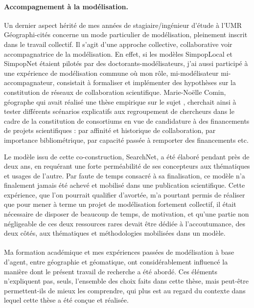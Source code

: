 \paragraph{Accompagnement à la modélisation.}
Un dernier aspect hérité de mes années de stagiaire/ingénieur d'étude à l'UMR Géographi-cités concerne un mode particulier de modélisation, pleinement inscrit dans le travail collectif.
Il s'agit d'une approche collective, collaborative voir accompagnatrice de la modélisation.
En effet, si les modèles SimpopLocal et SimpopNet étaient pilotés par des doctorants-modélisateurs, j'ai aussi participé à une expérience de modélisation commune où mon rôle, mi-modélisateur mi-accompagnateur, consistait à formaliser et implémenter des hypothèses sur la constitution de réseaux de collaboration scientifique.
Marie-Noëlle Comin, géographe qui avait réalisé une thèse empirique sur le sujet \autocite{comin_reseaux_2009}, cherchait ainsi à tester différents scénarios explicatifs aux regroupement de chercheurs dans le cadre de la constitution de consortiums en vue de candidature à des financements de projets scientifiques : par affinité et historique de collaboration, par importance bibliométrique, par capacité passée à remporter des financements etc.

Le modèle issu de cette co-construction, SearchNet, a été élaboré pendant près de deux ans, en requérant une forte perméabilité de ses concepteurs aux thématiques et usages de l'autre.
Par faute de temps consacré à sa finalisation, ce modèle n'a finalement jamais été achevé et mobilisé dans une publication scientifique.
Cette expérience, que l'on pourrait qualifier d'avortée, m'a pourtant permis de réaliser que pour mener à terme un projet de modélisation fortement collectif, il était nécessaire de disposer de beaucoup de temps, de motivation, et qu'une partie non négligeable de ces deux ressources rares devait être dédiée à l'accoutumance, des deux côtés, aux thématiques et méthodologies mobilisées dans un modèle.


\paragraph[Conclusion intermédiaire]{}
Ma formation académique et mes expériences passées de modélisation à base d'agent, entre géographie et géomatique, ont considérablement influencé la manière dont le présent travail de recherche a été abordé.
Ces éléments n'expliquent pas, seuls, l'ensemble des choix faits dans cette thèse, mais peut-être permettent-ils de mieux les comprendre, qui plus est au regard du contexte dans lequel cette thèse a été conçue et réalisée.


